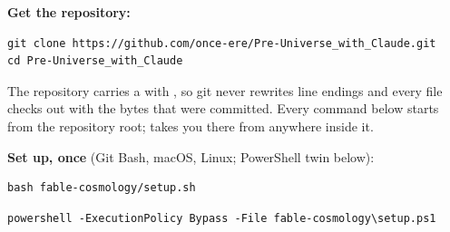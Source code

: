 \textbf{Get the repository:}

\begin{Verbatim}
git clone https://github.com/once-ere/Pre-Universe_with_Claude.git
cd Pre-Universe_with_Claude
\end{Verbatim}

The repository carries a  with , so git never rewrites line endings and every file checks out with the bytes that were committed. Every command below starts from the repository root;  takes you there from anywhere inside it.

\textbf{Set up, once} (Git Bash, macOS, Linux; PowerShell twin below):

\begin{Verbatim}
bash fable-cosmology/setup.sh
\end{Verbatim}

\begin{Verbatim}
powershell -ExecutionPolicy Bypass -File fable-cosmology\setup.ps1
\end{Verbatim}

